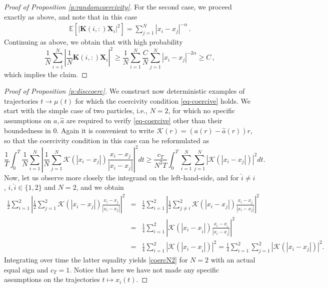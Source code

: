\documentclass[A4paper,11pt]{article}
\theoremstyle{definition}
\begin{document}
\begin{proof}[Proof of Proposition \ref{p:randomcoercivity}]
For the second case, we proceed exactly as above, and note that in this case
\begin{align*}
\mathbb{E}\left[|\mathbf{K}(i,:)\mathbf{X}_i|^2\right] = \sum_{j=1}^N |x_i-x_j|^{-\alpha}\,.
\end{align*}
Continuing as above, we obtain that with high probability
$$
\frac 1N\sum_{i=1}^N\left|\frac1N\mathbf{K}(i,:)\mathbf{X}_i\right|^2\ge \frac1N\sum_{i=1}^N\frac CN\sum_{j=1}^N |x_i-x_j|^{-2\alpha}\ge C \,,
$$
which implies the claim.
\end{proof}


\begin{proof}[Proof of Proposition \ref{p:disccoerc}]
We construct now  deterministic examples of trajectories $t \to \mu(t)$ for which the  coercivity condition \eqref{eq-coercive} holds.
We start with the simple case of two particles, i.e., $N=2$, for which no specific assumptions on $a,\widehat a$ are required to verify \eqref{eq-coercive} other than their boundedness in $0$. Again it is convenient to write $\mathcal K(r) = (a(r) - \widehat a(r)) r$, so that the coercivity condition in this case can be reformulated as 
\begin{equation}\label{coercN2}
\frac{1}{T} \int_0^T \frac{1}{N} \sum_{i=1}^N \left | \frac{1}{N} \sum_{j=1}^N \mathcal K(|x_i-x_j|) \frac{x_i-x_j}{|x_i-x_j|} \right |^2 dt \geq \frac{c_T}{N^2T} \int_0^T  \sum_{i=1}^N \sum_{j=1}^N |\mathcal K(|x_i-x_j|)|^2  dt.
\end{equation}
Now, let us observe more closely the integrand on the left-hand-side, and for $\widehat i \neq i$, $i,  \widehat i \in \{1,2\}$ and $N=2$, and we obtain
\begin{eqnarray*}
\frac{1}{2} \sum_{i=1}^2 \left | \frac{1}{2} \sum_{j=1}^2 \mathcal K(|x_i-x_j|) \frac{x_i-x_j}{|x_i-x_j|} \right |^2 &=& \frac{1}{2} \sum_{i=1}^2 \left | \frac{1}{2} \sum_{j\neq i}^2 \mathcal K(|x_i-x_j|) \frac{x_i-x_j}{|x_i-x_j|} \right |^2 \\
&=&  \frac{1}{4} \sum_{i=1}^2 \left |  \mathcal K(|x_i-x_{\widehat i}|) \frac{x_i-x_{\widehat i}}{|x_i-x_{\widehat i}|} \right |^2\\
&=& \frac{1}{4} \sum_{i=1}^2 \left |  \mathcal K(|x_i-x_{\widehat i}|) \right |^2=\frac{1}{4}  \sum_{i=1}^2 \sum_{j=1}^2 |\mathcal K(|x_i-x_j|)|^2.
\end{eqnarray*}
Integrating over time the latter equality yields \eqref{coercN2} for $N=2$ with an actual equal sign and $c_T=1$. Notice that here we have not made any specific assumptions on the trajectories $t \mapsto x_i(t)$. 

\end{proof}
\end{document}
